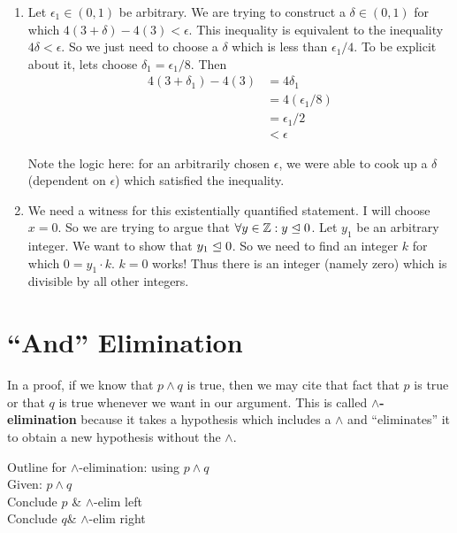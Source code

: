 \begin{solutions}
\begin{enumerate}
		\item Let $\epsilon_1 \in (0,1)$ be arbitrary.  We are trying to construct a $\delta \in (0,1)$ for which $4(3+\delta)-4(3) < \epsilon$.  This inequality is equivalent to the inequality $4\delta < \epsilon$.  So we just need to choose a $\delta$ which is less than $\epsilon_1/4$.  To be explicit about it, lets choose $\delta_1 = \epsilon_1/8$.  Then 
		\begin{align*}
			4(3+\delta_1)-4(3) &= 4\delta_1 \\
			&= 4(\epsilon_1/8)\\
			&=\epsilon_1/2\\
			&<\epsilon
		\end{align*}
		
		Note the logic here:  for an arbitrarily chosen $\epsilon$, we were able to cook up a $\delta$ (dependent on $\epsilon$) which satisfied the inequality.
		\item We need a witness for this existentially quantified statement.  I will choose $x=0$.  So we are trying to argue that $\forall y \in \mathbb{Z}:  y \trianglelefteq 0$.  Let $y_1$ be an arbitrary integer.  We want to show that $y_1 \trianglelefteq 0$.  So we need to find an integer $k$ for which $0 = y_1 \cdot k$.  $k=0$ works!  Thus there is an integer (namely zero) which is divisible by all other integers.
	\end{enumerate}
\end{solutions}




\section{``And'' Elimination}

In a proof, if we know that $p \wedge q$ is true, then we may cite that fact that $p$ is true or that $q$ is true whenever we want in our argument.  This is called \textbf{$\wedge$-elimination} because it takes a hypothesis which includes a $\wedge$ and ``eliminates'' it to obtain a new hypothesis without the $\wedge$.

\begin{fitch*}
	\textrm{Outline for $\wedge$-elimination:  using $p \wedge q$}\\
	\hspace{1 cm}\textrm{Given: $p \wedge q$}\\
	\hspace{1 cm}\textrm{Conclude $p$} & $\wedge$-elim left\\
	\hspace{1 cm}\textrm{Conclude $q$}& $\wedge$-elim right\\
	\end{fitch*}

